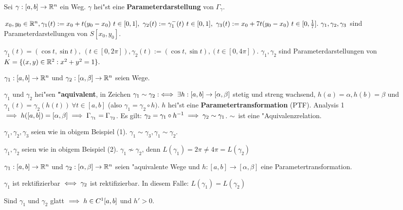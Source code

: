 \documentclass[a4paper,twoside,DIV15,BCOR12mm,chapterprefix=true,headings=twolinechapter]{scrbook}
\begin{document}
\begin{definition*}
Sei $\gamma:[a,b]\to\mathbb{R}^n$ ein Weg. $\gamma$ hei"st eine \textbf{Parameterdarstellung} von $\Gamma_\gamma$.
\end{definition*}

\begin{beispiele}
\item $x_0, y_0\in\MdR^n, \gamma_1(t):=x_0+t(y_0-x_0)\ t\in[0,1],\ \gamma_2(t):=\gamma_1^-(t)\ t\in[0,1],\ \gamma_3(t):=x_0+7t(y_0-x_0)\ t\in[0,\frac{1}{7}].\ \gamma_1,\gamma_2,\gamma_3$ sind Parameterdarstellungen von $S[x_0, y_0]$.
\item $\gamma_1(t)=(\cos t, \sin t),\ (t\in [0,2\pi]), \gamma_2(t):=(\cos t, \sin t), (t\in[0,4\pi])$. $\gamma_1, \gamma_2$ sind Parameterdarstellungen von $K=\{(x,y)\in\mathbb{R}^2: x^2+y^2=1\}.$
\end{beispiele}

\begin{definition*}
$\gamma_1:[a,b]\to\mathbb{R}^n$ und $\gamma_2:[\alpha,\beta]\to\mathbb{R}^n$ seien Wege.

$\gamma_1$ und $\gamma_2$ hei"sen \textbf{"aquivalent}, in Zeichen $\gamma_1\sim\gamma_2:\iff\exists h:[a,b]\to[\alpha, \beta]$ stetig und streng wachsend, $h(a)=\alpha, h(b)=\beta$ und $\gamma_1(t)=\gamma_2(h(t))\ \forall t\in[a,b]$ (also $\gamma_1=\gamma_2\circ h)$. $h$ hei"st eine \textbf{Parametertransformation} (PTF). Analysis 1 $\implies h([a,b])=[\alpha,\beta]\implies \Gamma_{\gamma_1}=\Gamma_{\gamma_2}$.
Es gilt: $\gamma_2=\gamma_1\circ h^{-1}\implies \gamma_2\sim\gamma_1$. \glqq$\sim$\grqq\ ist eine "Aquivalenzrelation.
\end{definition*}

\begin{beispiele}
\item $\gamma_1, \gamma_2, \gamma_3$ seien wie in obigem Beispiel (1). $\gamma_1\sim\gamma_3, \gamma_1\sim\gamma_2$.
\item $\gamma_1, \gamma_2$ seien wie in obigem Beispiel (2). $\gamma_1\nsim\gamma_2$, denn $L(\gamma_1)=2\pi\ne 4\pi=L(\gamma_2)$
\end{beispiele}

\begin{satz}
$\gamma_1:[a,b]\to\mathbb{R}^n$ und $\gamma_2:[\alpha,\beta]\to\mathbb{R}^n$ seien "aquivalente Wege und $h:[a,b]\to[\alpha,\beta]$ eine Parametertransformation.
\begin{liste}
\item $\gamma_1$ ist rektifizierbar $\iff \gamma_2$ ist rektifizierbar. In diesem Falle: $L(\gamma_1)=L(\gamma_2)$
\item Sind $\gamma_1$ und $\gamma_2$ glatt $\implies h\in C^1[a,b]$ und $h'>0$.
\end{liste}
\end{satz}
\end{document}
